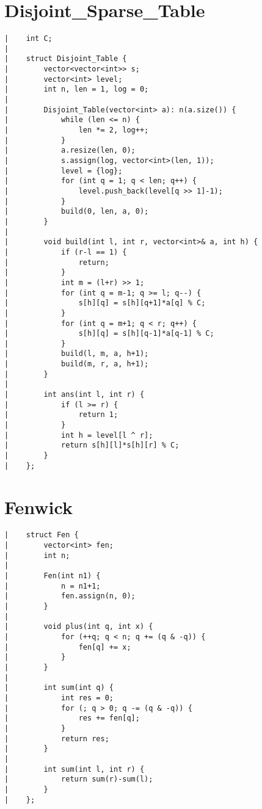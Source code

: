 \documentclass[a4paper, 10pt]{article}
\begin{document}
\begin{center}
\section*{Disjoint\_Sparse\_Table}
\begin{verbatim}
|    int C;
|    
|    struct Disjoint_Table {
|        vector<vector<int>> s;
|        vector<int> level;
|        int n, len = 1, log = 0;
|    
|        Disjoint_Table(vector<int> a): n(a.size()) {
|            while (len <= n) {
|                len *= 2, log++;
|            }
|            a.resize(len, 0);
|            s.assign(log, vector<int>(len, 1));
|            level = {log};
|            for (int q = 1; q < len; q++) {
|                level.push_back(level[q >> 1]-1);
|            }
|            build(0, len, a, 0);
|        }
|    
|        void build(int l, int r, vector<int>& a, int h) {
|            if (r-l == 1) {
|                return;
|            }
|            int m = (l+r) >> 1;
|            for (int q = m-1; q >= l; q--) {
|                s[h][q] = s[h][q+1]*a[q] % C;
|            }
|            for (int q = m+1; q < r; q++) {
|                s[h][q] = s[h][q-1]*a[q-1] % C;
|            }
|            build(l, m, a, h+1);
|            build(m, r, a, h+1);
|        }
|    
|        int ans(int l, int r) {
|            if (l >= r) {
|                return 1;
|            }
|            int h = level[l ^ r];
|            return s[h][l]*s[h][r] % C;
|        }
|    };
\end{verbatim}

\section*{Fenwick}
\begin{verbatim}
|    struct Fen {
|        vector<int> fen;
|        int n;
|    
|        Fen(int n1) {
|            n = n1+1;
|            fen.assign(n, 0);
|        }
|    
|        void plus(int q, int x) {
|            for (++q; q < n; q += (q & -q)) {
|                fen[q] += x;
|            }
|        }
|    
|        int sum(int q) {
|            int res = 0;
|            for (; q > 0; q -= (q & -q)) {
|                res += fen[q];
|            }
|            return res;
|        }
|    
|        int sum(int l, int r) {
|            return sum(r)-sum(l);
|        }
|    };
\end{verbatim}


\end{center}
\end{document}
